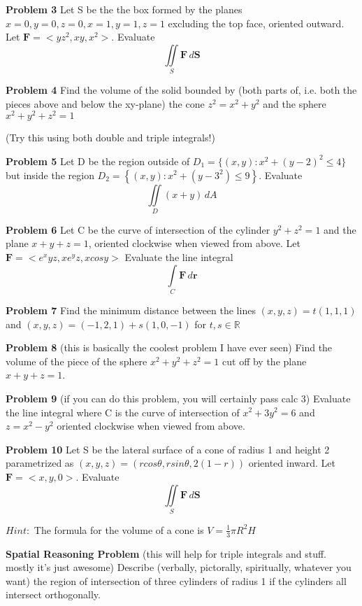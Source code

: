 \documentclass[a4paper, 12pt]{article} %
\numberwithin{equation}{section}
\begin{document}
\vspace{85mm}

\textbf{Problem 3} Let S be the the box formed by the planes $x=0, y=0, z=0, x=1, y=1, z=1$ excluding the top face, oriented outward. Let $\textbf{F}=<yz^2, xy, x^2>$. Evaluate 
$$
\iint\limits_{S}\textbf{F}\, d\textbf{S}
$$

\vspace{75mm}

\textbf{Problem 4} Find the volume of the solid bounded by (both parts of, i.e. both the pieces above and below the xy-plane) the cone $z^2=x^2+y^2$ and the sphere $x^2+y^2+z^2=1$

(Try this using both double and triple integrals!)

\vspace{90mm}

\textbf{Problem 5} Let D be the region outside of $D_1={\lbrace(x,y): x^2+(y-2)^2 \leq 4}\rbrace$ but inside the region $D_2={\left\lbrace (x,y):x^2+(y-3^2) \leq 9\right\rbrace}$. Evaluate 
$$
\iint\limits_{D}(x+y)\, dA
$$

\vspace{75mm}


\textbf{Problem 6} Let C be the curve of intersection of the cylinder $y^2+z^2=1$ and the plane $x+y+z=1$, oriented clockwise when viewed from above. Let $\textbf{F}=<e^xyz, xe^yz, xcosy>$ Evaluate the line integral $$
\int\limits_{C}\textbf{F}\, d\textbf{r}
$$

\vspace{95mm}


\textbf{Problem 7} Find the minimum distance between the lines $(x,y,z)=t(1,1,1)$ and $(x,y,z)=(-1,2,1)+s(1,0,-1)$ for $t,s \in \mathbb{R}$

\vspace{100mm}


\textbf{Problem 8} (this is basically the coolest problem I have ever seen) Find the volume of the piece of the sphere $x^2+y^2+z^2=1$ cut off by the plane $x+y+z=1$.

\vspace{95mm}


\textbf{Problem 9} (if you can do this problem, you will certainly pass calc 3)
Evaluate the line integral where C is the curve of intersection of $x^2+3y^2=6$ and $z=x^2-y^2$ oriented clockwise when viewed from above.

\vspace{100mm}

\textbf{Problem 10} Let S be the lateral surface of a cone of radius 1 and height 2 parametrized as $(x,y,z)=(rcos\theta, rsin\theta, 2(1-r))$ oriented inward. Let $\textbf{F}=<x,y,0>$. Evaluate 
$$
\iint\limits_{S}\textbf{F}\, d\textbf{S}
$$

$Hint:$ The formula for the volume of a cone is $V=\frac{1}{3} \pi R^2H$

\vspace{75mm}

\textbf{Spatial Reasoning Problem} (this will help for triple integrals and stuff. mostly it's just awesome) Describe (verbally, pictorally, spiritually, whatever you want) the region of intersection of three cylinders of radius 1 if the cylinders all intersect orthogonally.
\end{document}
